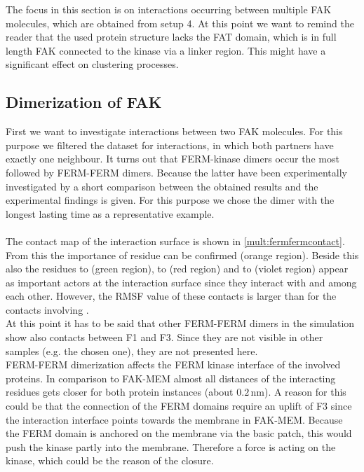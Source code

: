 \label{multiProt}
The focus in this section is on interactions occurring between multiple FAK molecules, which are obtained from setup 4. At this point we want to remind the reader that the used protein structure lacks the FAT domain, which is in full length FAK connected to the kinase via a linker region. This might have a significant effect on clustering processes.
\subsection{Dimerization of FAK}
\label{mult:dimers}
First we want to investigate interactions between two FAK molecules. For this purpose we filtered the dataset for interactions, in which both partners have exactly one neighbour. It turns out that FERM-kinase dimers occur the most followed by FERM-FERM dimers. Because the latter have been experimentally investigated by \textcite{fakdimers} a short comparison between the obtained results and the experimental findings is given. For this purpose we chose the dimer with the longest lasting time as a representative example.\\ %
\\
The contact map of the interaction surface is shown in \autoref{mult:fermfermcontact}. From this the importance of residue  can be confirmed (orange region). Beside this also the residues  to  (green region),  to  (red region) and  to  (violet region) appear as important actors at the interaction surface since they interact with  and among each other. However, the RMSF value of these contacts is larger than for the contacts involving .\\
At this point it has to be said that other FERM-FERM dimers in the simulation show also contacts between F1 and F3. Since they are not visible in other samples (e.g. the chosen one), they are not presented here.\\
FERM-FERM dimerization affects the FERM kinase interface of the involved proteins. In comparison to FAK-MEM almost all distances of the interacting residues gets closer for both protein instances (about $0.2\,\si{\nano\metre}$). A reason for this could be that the connection of the FERM domains require an uplift of F3 since the interaction interface points towards the membrane in FAK-MEM. Because the FERM domain is anchored on the membrane via the basic patch, this would push the kinase partly into the membrane. Therefore a force is acting on the kinase, which could be the reason of the closure. %
